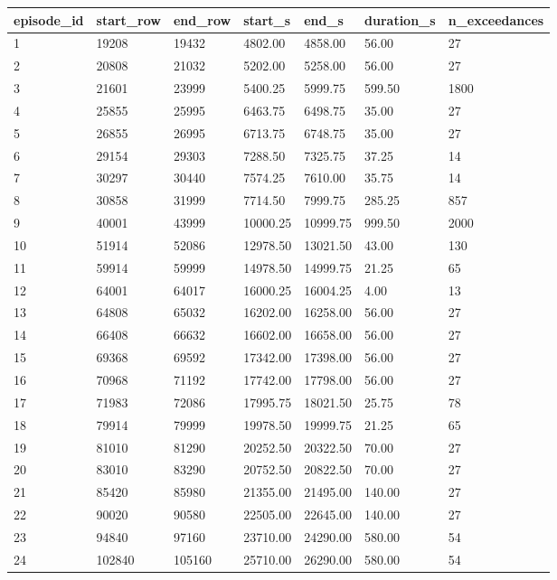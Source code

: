 \begin{tabular}{lllllll}
\toprule
episode\_id & start\_row & end\_row & start\_s & end\_s & duration\_s & n\_exceedances \\
\midrule
1 & 19208 & 19432 & 4802.00 & 4858.00 & 56.00 & 27 \\
2 & 20808 & 21032 & 5202.00 & 5258.00 & 56.00 & 27 \\
3 & 21601 & 23999 & 5400.25 & 5999.75 & 599.50 & 1800 \\
4 & 25855 & 25995 & 6463.75 & 6498.75 & 35.00 & 27 \\
5 & 26855 & 26995 & 6713.75 & 6748.75 & 35.00 & 27 \\
6 & 29154 & 29303 & 7288.50 & 7325.75 & 37.25 & 14 \\
7 & 30297 & 30440 & 7574.25 & 7610.00 & 35.75 & 14 \\
8 & 30858 & 31999 & 7714.50 & 7999.75 & 285.25 & 857 \\
9 & 40001 & 43999 & 10000.25 & 10999.75 & 999.50 & 2000 \\
10 & 51914 & 52086 & 12978.50 & 13021.50 & 43.00 & 130 \\
11 & 59914 & 59999 & 14978.50 & 14999.75 & 21.25 & 65 \\
12 & 64001 & 64017 & 16000.25 & 16004.25 & 4.00 & 13 \\
13 & 64808 & 65032 & 16202.00 & 16258.00 & 56.00 & 27 \\
14 & 66408 & 66632 & 16602.00 & 16658.00 & 56.00 & 27 \\
15 & 69368 & 69592 & 17342.00 & 17398.00 & 56.00 & 27 \\
16 & 70968 & 71192 & 17742.00 & 17798.00 & 56.00 & 27 \\
17 & 71983 & 72086 & 17995.75 & 18021.50 & 25.75 & 78 \\
18 & 79914 & 79999 & 19978.50 & 19999.75 & 21.25 & 65 \\
19 & 81010 & 81290 & 20252.50 & 20322.50 & 70.00 & 27 \\
20 & 83010 & 83290 & 20752.50 & 20822.50 & 70.00 & 27 \\
21 & 85420 & 85980 & 21355.00 & 21495.00 & 140.00 & 27 \\
22 & 90020 & 90580 & 22505.00 & 22645.00 & 140.00 & 27 \\
23 & 94840 & 97160 & 23710.00 & 24290.00 & 580.00 & 54 \\
24 & 102840 & 105160 & 25710.00 & 26290.00 & 580.00 & 54 \\
\bottomrule
\end{tabular}
